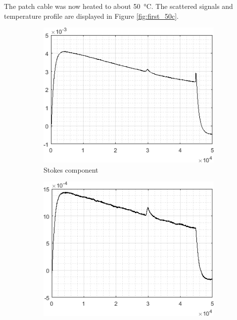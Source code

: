 \documentclass{standalone}
\begin{document}
The patch cable was now heated to about \SI{50}{\celsius}. The scattered signals and temperature profile are displayed in Figure \ref{fig:first_50c}.
\begin{figure}[h!]
	\begin{subfigure}[b]{0.49\textwidth}
		\flushleft
		\includegraphics[width=\textwidth]{first_50c_stokes.png}
		\caption{Stokes component}
		\vspace{1em}
	\end{subfigure}
	\begin{subfigure}[b]{0.49\textwidth}
		\flushright
		\includegraphics[width=\textwidth]{first_50c_antistokes.png}

\end{subfigure}
\end{figure}
\end{document}
